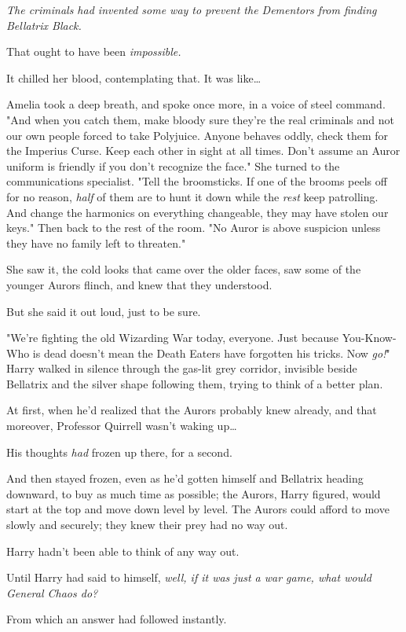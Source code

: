\emph{The criminals had invented some way to prevent the Dementors from finding 
Bellatrix Black.}

That ought to have been \emph{impossible.}

It chilled her blood, contemplating that. It was like{\ldots}

Amelia took a deep breath, and spoke once more, in a voice of steel command. 
"And when you catch them, make bloody sure they're the real criminals and not 
our own people forced to take Polyjuice. Anyone behaves oddly, check them for 
the Imperius Curse. Keep each other in sight at all times. Don't assume an 
Auror uniform is friendly if you don't recognize the face." She turned to the 
communications specialist. "Tell the broomsticks. If one of the brooms peels 
off for no reason, \emph{half} of them are to hunt it down while the 
\emph{rest} keep patrolling. And change the harmonics on everything changeable, 
they may have stolen our keys." Then back to the rest of the room. "No Auror is 
above suspicion unless they have no family left to threaten."

She saw it, the cold looks that came over the older faces, saw some of the 
younger Aurors flinch, and knew that they understood.

But she said it out loud, just to be sure.

"We're fighting the old Wizarding War today, everyone. Just because 
You-Know-Who is dead doesn't mean the Death Eaters have forgotten his tricks. 
Now \emph{go!}"
\sbreak
Harry walked in silence through the gas-lit grey corridor, invisible beside 
Bellatrix and the silver shape following them, trying to think of a better plan.

At first, when he'd realized that the Aurors probably knew already, and that 
moreover, Professor Quirrell wasn't waking up{\ldots}

His thoughts \emph{had} frozen up there, for a second.

And then stayed frozen, even as he'd gotten himself and Bellatrix heading 
downward, to buy as much time as possible; the Aurors, Harry figured, would 
start at the top and move down level by level. The Aurors could afford to move 
slowly and securely; they knew their prey had no way out.

Harry hadn't been able to think of any way out.

Until Harry had said to himself, \emph{well, if it was just a war game, what 
would General Chaos do?}

From which an answer had followed instantly.

